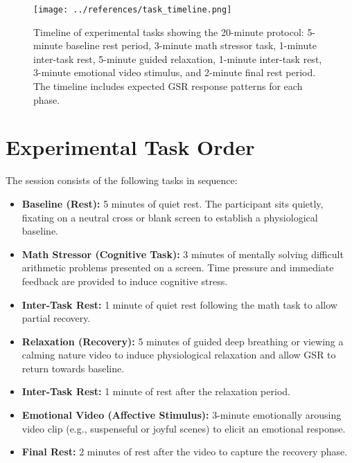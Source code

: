 \documentclass{article}
\begin{document}
\begin{figure}[h]
    \centering
    \texttt{[image: ../references/task\_timeline.png]}
    \caption{Timeline of experimental tasks showing the 20-minute protocol: 5-minute baseline rest period, 3-minute math stressor task, 1-minute inter-task rest, 5-minute guided relaxation, 1-minute inter-task rest, 3-minute emotional video stimulus, and 2-minute final rest period. The timeline includes expected GSR response patterns for each phase.}
\end{figure}

\section{Experimental Task Order}

The session consists of the following tasks in sequence:

\begin{itemize}
    \item \textbf{Baseline (Rest):} 5 minutes of quiet rest. The participant sits quietly, fixating on a neutral cross or blank screen to establish a physiological baseline.
    \item \textbf{Math Stressor (Cognitive Task):} 3 minutes of mentally solving difficult arithmetic problems presented on a screen. Time pressure and immediate feedback are provided to induce cognitive stress.
    \item \textbf{Inter-Task Rest:} 1 minute of quiet rest following the math task to allow partial recovery.
    \item \textbf{Relaxation (Recovery):} 5 minutes of guided deep breathing or viewing a calming nature video to induce physiological relaxation and allow GSR to return towards baseline.
    \item \textbf{Inter-Task Rest:} 1 minute of rest after the relaxation period.
    \item \textbf{Emotional Video (Affective Stimulus):} 3-minute emotionally arousing video clip (e.g., suspenseful or joyful scenes) to elicit an emotional response.
    \item \textbf{Final Rest:} 2 minutes of rest after the video to capture the recovery phase.
\end{itemize}
\end{document}
